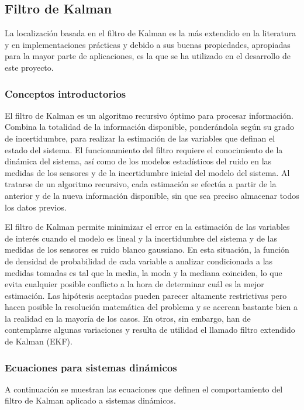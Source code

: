 \subsection {Filtro de Kalman}
La localización basada en el filtro de Kalman es la más extendido en la literatura y en implementaciones prácticas y debido a sus buenas propiedades, apropiadas para la mayor parte de aplicaciones, es la que se ha utilizado en el desarrollo de este proyecto.

\subsubsection {Conceptos introductorios}
El filtro de Kalman es un algoritmo recursivo óptimo para procesar información\cite{Maybeck79}. Combina la totalidad de la información disponible, ponderándola según su grado de incertidumbre, para realizar la estimación de las variables que definan el estado del sistema. El funcionamiento del filtro requiere el conocimiento de la dinámica del sistema, así como de los modelos estadísticos del ruido en las medidas de los sensores y de la incertidumbre inicial del modelo del sistema. Al tratarse de un algoritmo recursivo, cada estimación se efectúa a partir de la anterior y de la nueva información disponible, sin que sea preciso almacenar todos los datos previos.

El filtro de Kalman permite minimizar el error en la estimación de las variables de interés cuando el modelo es lineal y la incertidumbre del sistema y de las medidas de los sensores es ruido blanco gaussiano. En esta situación, la función de densidad de probabilidad de cada variable a analizar condicionada a las medidas tomadas es tal que la media, la moda y la mediana coinciden, lo que evita cualquier posible conflicto a la hora de determinar cuál es la mejor estimación.
Las hipótesis aceptadas pueden parecer altamente restrictivas pero hacen posible la resolución matemática del problema y se acercan bastante bien a la realidad en la mayoría de los casos. En otros, sin embargo, han de contemplarse algunas variaciones y resulta de utilidad el llamado filtro extendido de Kalman (EKF).

\subsubsection{Ecuaciones para sistemas dinámicos}
A continuación se muestran las ecuaciones que definen el comportamiento del filtro de Kalman aplicado a sistemas dinámicos\cite{Schutter99}.

